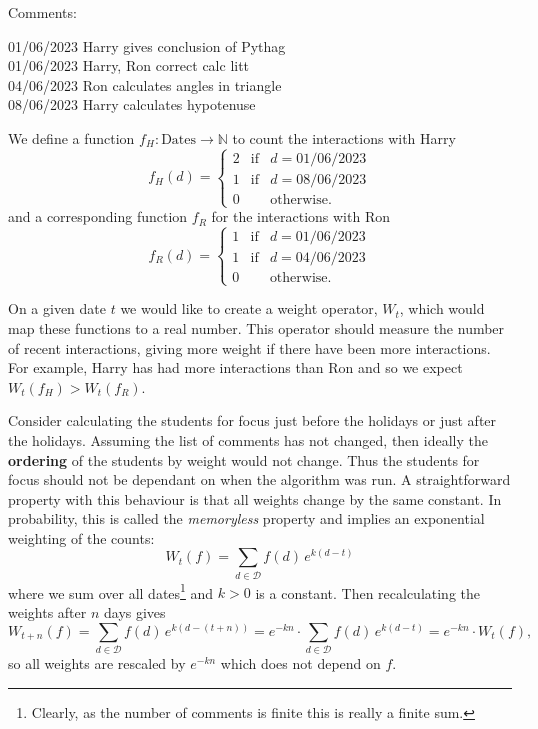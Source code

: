 \documentclass[10pt]{article}
\begin{document}
\begin{tcolorbox}
Comments:

01/06/2023 Harry gives conclusion of Pythag \\
01/06/2023 Harry, Ron correct calc litt \\
04/06/2023 Ron calculates angles in triangle \\
08/06/2023 Harry calculates hypotenuse
\end{tcolorbox}
We define a function $f_H : \mbox{Dates} \to \mathbb{N}$ to count the interactions with Harry
$$ f_{H}(d) = \left\{ \begin{matrix} 2 &  \mbox{if} & d=\mbox{01/06/2023} \\ 1 & \mbox{if} & d=\mbox{08/06/2023}  \\ 0 && \mbox{otherwise.} \end{matrix} \right. $$
and a corresponding function $f_R$ for the interactions with Ron
$$ f_{R}(d) = \left\{ \begin{matrix} 1 &  \mbox{if} & d=\mbox{01/06/2023}  \\ 1 &  \mbox{if} & d=\mbox{04/06/2023}  \\  0 && \mbox{otherwise.} \end{matrix} \right. $$

On a given date $t$ we would like to create a weight operator, $W_t$, which would map these functions to a real number. This operator should measure the number of recent interactions, giving more weight if there have been more interactions. For example, Harry has had more interactions than Ron and so we expect $W_t(f_H) > W_t(f_R)$.

Consider calculating the students for focus just before the holidays or just after the holidays. Assuming the list of comments has not changed, then ideally the \textbf{ordering} of the students by weight would not change. Thus the students for focus should not be dependant on when the algorithm was run. A straightforward property with this behaviour is that all weights change by the same constant. In probability, this is called the \emph{memoryless} property \cite{Norr98} and implies an exponential weighting of the counts:
$$ W_t(f) = \sum_{d \in \mathcal{D}} f(d) \, e^{k(d-t)} $$
where we sum over all dates\footnote{Clearly, as the number of comments is finite this is really a finite sum.}  and $k>0$ is a constant. Then recalculating the weights after $n$ days gives
$$W_{t+n}(f) = \sum_{d \in \mathcal{D}} f(d) \, e^{k(d-(t+n))} =  e^{-kn} \cdot \sum_{d \in \mathcal{D}} f(d) \, e^{k(d-t)} = e^{-kn} \cdot  W_t(f),$$
so all weights are rescaled by $e^{-kn}$ which does not depend on $f$.
\end{document}
